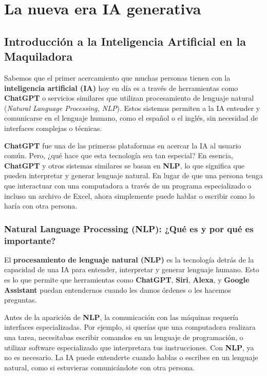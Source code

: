 \documentclass[
  10pt,
  letterpaper,
]{book}
\begin{document}
\section{La nueva era IA generativa}\label{la-nueva-era-ia-generativa}

\subsection{Introducción a la Inteligencia Artificial en la
Maquiladora}\label{introducciuxf3n-a-la-inteligencia-artificial-en-la-maquiladora}

Sabemos que el primer acercamiento que muchas personas tienen con la
\textbf{inteligencia artificial (IA)} hoy en día es a través de
herramientas como \textbf{ChatGPT} o servicios similares que utilizan
procesamiento de lenguaje natural (\emph{Natural Language Processing,
NLP}). Estos sistemas permiten a la IA entender y comunicarse en el
lenguaje humano, como el español o el inglés, sin necesidad de
interfaces complejas o técnicas.

\textbf{ChatGPT} fue una de las primeras plataformas en acercar la IA al
usuario común. Pero, ¿qué hace que esta tecnología sea tan especial? En
esencia, \textbf{ChatGPT} y otros sistemas similares se basan en
\textbf{NLP}, lo que significa que pueden interpretar y generar lenguaje
natural. En lugar de que una persona tenga que interactuar con una
computadora a través de un programa especializado o incluso un archivo
de Excel, ahora simplemente puede hablar o escribir como lo haría con
otra persona.

\subsubsection{\texorpdfstring{\textbf{Natural Language Processing
(NLP): ¿Qué es y por qué es
importante?}}{Natural Language Processing (NLP): ¿Qué es y por qué es importante?}}\label{natural-language-processing-nlp-quuxe9-es-y-por-quuxe9-es-importante}

El \textbf{procesamiento de lenguaje natural (NLP)} es la tecnología
detrás de la capacidad de una IA para entender, interpretar y generar
lenguaje humano. Esto es lo que permite que herramientas como
\textbf{ChatGPT}, \textbf{Siri}, \textbf{Alexa}, y \textbf{Google
Assistant} puedan entendernos cuando les damos órdenes o les hacemos
preguntas.

Antes de la aparición de \textbf{NLP}, la comunicación con las máquinas
requería interfaces especializadas. Por ejemplo, si querías que una
computadora realizara una tarea, necesitabas escribir comandos en un
lenguaje de programación, o utilizar software especializado que
interpretara tus instrucciones. Con \textbf{NLP}, ya no es necesario. La
IA puede entenderte cuando hablas o escribes en un lenguaje natural,
como si estuvieras comunicándote con otra persona.
\end{document}
